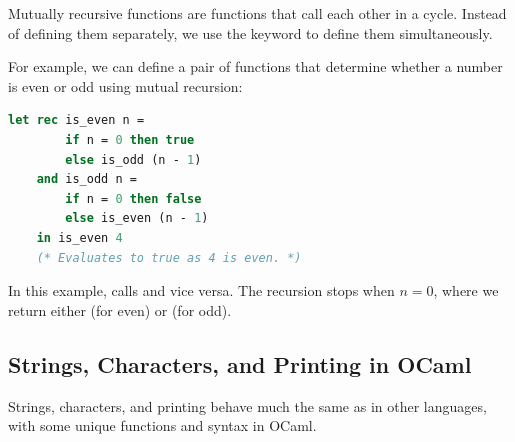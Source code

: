 \newpage 

\begin{Def}

    Mutually recursive functions are functions that call each other in a cycle. Instead of defining them separately, we use the keyword  to define them simultaneously.
    
    For example, we can define a pair of functions that determine whether a number is even or odd using mutual recursion:
    
    \begin{lstlisting}[language=OCaml, caption={Mutually Recursive Even and Odd Functions}, numbers=none]
    let rec is_even n =
        if n = 0 then true
        else is_odd (n - 1)
    and is_odd n =
        if n = 0 then false
        else is_even (n - 1)
    in is_even 4
    (* Evaluates to true as 4 is even. *)
    \end{lstlisting}
    
    \noindent In this example,  calls  and vice versa. The recursion stops when \( n = 0 \), where we return either  (for even) or  (for odd).
\end{Def}    
\newpage
\subsection{Strings, Characters, and Printing in OCaml}

Strings, characters, and printing behave much the same as in other languages, with some unique functions and syntax in OCaml.

